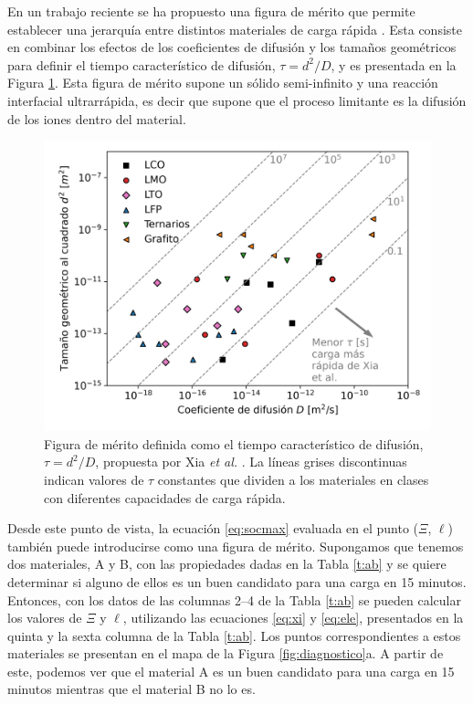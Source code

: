 En un trabajo reciente se ha propuesto una figura de mérito que permite establecer 
una jerarquía entre distintos materiales de carga rápida \cite{xia2022}. 
Esta consiste en combinar los efectos de los coeficientes de difusión y los 
tamaños geométricos para definir el tiempo característico de difusión, 
$\tau = d^2 / D$, y es presentada en la Figura \ref{fig:xiafom}. Esta figura de 
mérito supone un sólido semi-infinito y una reacción interfacial ultrarrápida, 
es decir que supone que el proceso limitante es la difusión de los iones dentro 
del material.
\begin{figure}[h!]
    \centering
    \includegraphics[width=.7\textwidth]{FastCharging/un/introduccion/xiafom.png}
    \caption{Figura de mérito definida como el tiempo característico de difusión, 
    $\tau = d^2/D$, propuesta por Xia \textit{et al.} \cite{xia2022}. La líneas
    grises discontinuas indican valores de $\tau$ constantes que dividen a los 
    materiales en clases con diferentes capacidades de carga rápida.}
    \label{fig:xiafom}
\end{figure}
Desde
este punto de vista, la ecuación \ref{eq:socmax} evaluada en el punto ($\Xi$, 
$\ell$) también puede introducirse como una figura de mérito. Supongamos que 
tenemos dos materiales, A y B, con las propiedades dadas en la Tabla \ref{t:ab} y 
se quiere determinar si alguno de ellos es un buen candidato para una carga en 15 
minutos. Entonces, con los datos de las columnas 2--4 de la Tabla \ref{t:ab} 
se pueden calcular los valores de $\Xi$ y $\ell$, utilizando las ecuaciones 
\ref{eq:xi} y \ref{eq:ele}, presentados en la quinta y la sexta columna de la 
Tabla \ref{t:ab}. Los puntos correspondientes a estos materiales se presentan en 
el mapa de la Figura \ref{fig:diagnostico}a. A partir de este, podemos ver que el 
material A es un buen candidato para una carga en 15 minutos mientras que el 
material B no lo es.
